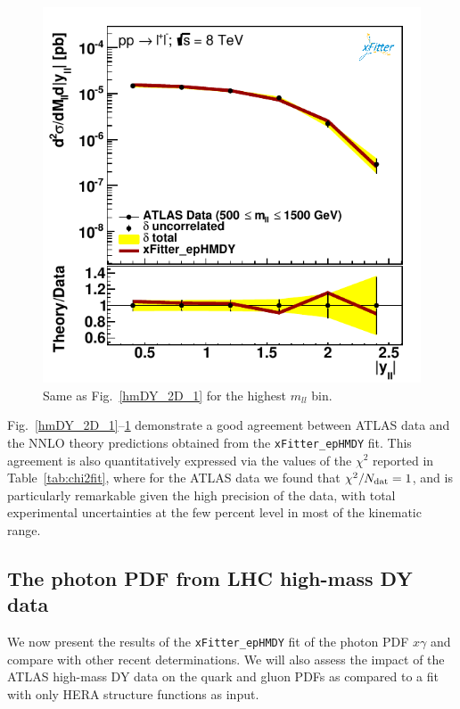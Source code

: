 \begin{figure}[t]
\centering
\includegraphics[width=14cm]{figs/data_405-1.pdf}
\caption{Same as Fig.~\ref{hmDY_2D_1} for the highest $m_{ll}$ bin.
}
\label{hmDY_2D_3}
\end{figure}

Fig.~\ref{hmDY_2D_1}--\ref{hmDY_2D_3} demonstrate
a good agreement between ATLAS data and the NNLO theory
predictions obtained from the {\tt xFitter\_epHMDY} fit.
%
This agreement is also quantitatively expressed via the values of the $\chi^2$ reported in
Table~\ref{tab:chi2fit}, where for the ATLAS data we found
that $\chi^2/N_{\rm dat}=1$, and is particularly remarkable
given the high precision of the data, with total experimental
uncertainties at the few percent level in most of the kinematic range.

\subsection{The photon PDF from LHC high-mass DY data}

We now present the results of the {\tt xFitter\_epHMDY}
fit of the photon PDF $x\gamma$ and compare with
other recent determinations. We will also assess the impact
of the ATLAS high-mass DY data on the quark and gluon PDFs as compared
to a fit with only HERA structure functions as input.

